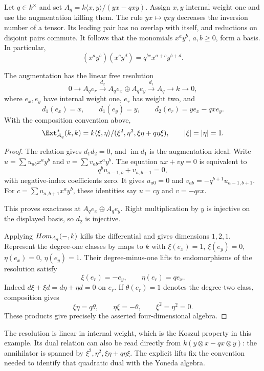 Let $q\in k^\times$ and set $A_q=k\langle x,y\rangle/(yx-qxy)$.
Assign $x,y$ internal weight one and use the augmentation killing them.
The rule $yx\mapsto qxy$ decreases the inversion number of a tensor.
Its leading pair has no overlap with itself, and reductions on disjoint pairs commute.
It follows that the monomials $x^ay^b$, $a,b\ge0$, form a basis.
In particular,
\[
 (x^ay^b)(x^cy^d)=q^{bc}x^{a+c}y^{b+d}.
\]

\begin{proposition}
\label{prop:alg-quantum-plane}
The augmentation has the linear free resolution
\[
 0\longrightarrow A_q e_r
 \xrightarrow{d_2}A_q e_x\oplus A_q e_y
 \xrightarrow{d_1}A_q\longrightarrow k\longrightarrow0,
\]
where $e_x,e_y$ have internal weight one, $e_r$ has weight two, and
\[
 d_1(e_x)=x,\qquad d_1(e_y)=y,\qquad
 d_2(e_r)=y e_x-qx e_y.
\]
With the composition convention above,
\[
 \Ext^*_{A_q}(k,k)
 =k\langle\xi,\eta\rangle/(\xi^2,\eta^2,\xi\eta+q\eta\xi),
 \qquad |\xi|=|\eta|=1.
\]
\end{proposition}
\begin{proof}
The relation gives $d_1d_2=0$, and $\operatorname{im}d_1$ is the augmentation ideal.
Write $u=\sum u_{ab}x^ay^b$ and $v=\sum v_{ab}x^ay^b$.
The equation $ux+vy=0$ is equivalent to
\[
 q^b u_{a-1,b}+v_{a,b-1}=0,
\]
with negative-index coefficients zero.
It gives $u_{a0}=0$ and $v_{ab}=-q^{b+1}u_{a-1,b+1}$.
For $c=\sum u_{a,b+1}x^ay^b$, these identities say $u=cy$ and $v=-qcx$.

This proves exactness at $A_qe_x\oplus A_qe_y$.
Right multiplication by $y$ is injective on the displayed basis, so $d_2$ is injective.

Applying $Hom_{A_q}(-,k)$ kills the differential and gives dimensions $1,2,1$.
Represent the degree-one classes by maps to $k$ with
$\xi(e_x)=1$, $\xi(e_y)=0$, $\eta(e_x)=0$, $\eta(e_y)=1$.
Their degree-minus-one lifts to endomorphisms of the resolution satisfy
\[
 \xi(e_r)=-e_y,\qquad \eta(e_r)=q e_x.
\]
Indeed $d\xi+\xi d=d\eta+\eta d=0$ on $e_r$.
If $\theta(e_r)=1$ denotes the degree-two class, composition gives
\[
 \xi\eta=q\theta,\qquad \eta\xi=-\theta,
 \qquad \xi^2=\eta^2=0.
\]
These products give precisely the asserted four-dimensional algebra.
\end{proof}

The resolution is linear in internal weight, which is the Koszul property in this example.
Its dual relation can also be read directly from
$k(y\otimes x-q x\otimes y)$: the annihilator is spanned by
$\xi^2,\eta^2,\xi\eta+q\eta\xi$.
The explicit lifts fix the convention needed to identify that quadratic dual with the Yoneda algebra.

